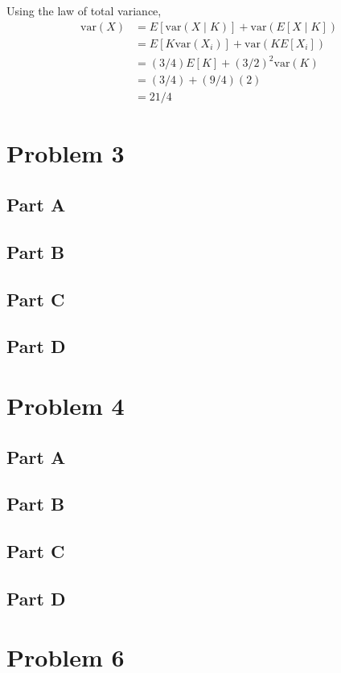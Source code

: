 \documentclass{article}
\begin{document}
Using the law of total variance,
\begin{align*}
  \mathrm{var}(X) &= E[\mathrm{var}(X \mid K)] + \mathrm{var}(E[X \mid K]) \\
  &= E[K \mathrm{var}(X_i)] + \mathrm{var}(K E[X_i]) \\
  &= (3 / 4) E[K] + (3 / 2)^2 \mathrm{var}(K) \\
  &= (3 / 4) + (9 / 4)(2) \\
  &= 21 / 4
\end{align*}

\section*{Problem 3}

\subsection*{Part A}

\subsection*{Part B}

\subsection*{Part C}

\subsection*{Part D}

\section*{Problem 4}

\subsection*{Part A}

\subsection*{Part B}

\subsection*{Part C}

\subsection*{Part D}

\section*{Problem 6}
\end{document}
